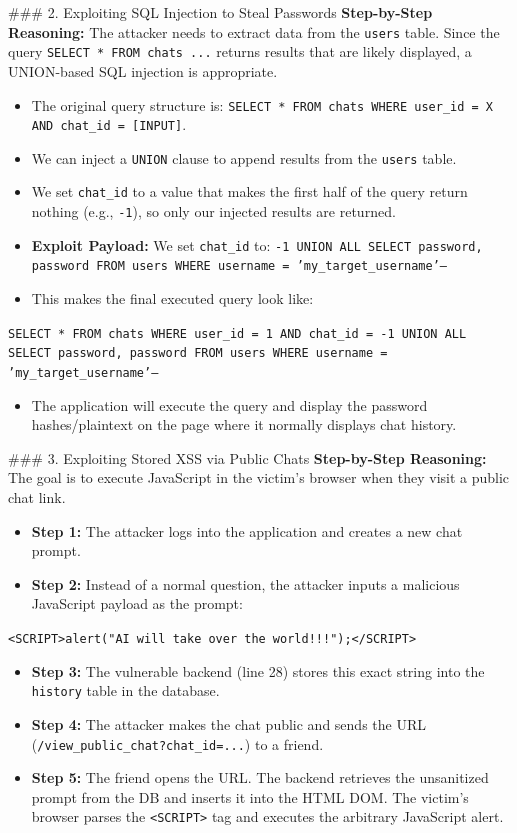 \documentclass{article}
\begin{document}
\#\#\# 2. Exploiting SQL Injection to Steal Passwords
\textbf{Step-by-Step Reasoning:}
The attacker needs to extract data from the \texttt{users} table. Since the query \texttt{SELECT * FROM chats ...} returns results that are likely displayed, a UNION-based SQL injection is appropriate.
\begin{itemize}
    \item The original query structure is: \texttt{SELECT * FROM chats WHERE user\_id = X AND chat\_id = [INPUT]}.
    \item We can inject a \texttt{UNION} clause to append results from the \texttt{users} table.
    \item We set \texttt{chat\_id} to a value that makes the first half of the query return nothing (e.g., \texttt{-1}), so only our injected results are returned.
    \item \textbf{Exploit Payload:} We set \texttt{chat\_id} to: \texttt{-1 UNION ALL SELECT password, password FROM users WHERE username = 'my\_target\_username'--}
    \item This makes the final executed query look like:
\end{itemize}
\texttt{SELECT * FROM chats WHERE user\_id = 1 AND chat\_id = -1 UNION ALL SELECT password, password FROM users WHERE username = 'my\_target\_username'--}
\begin{itemize}
    \item The application will execute the query and display the password hashes/plaintext on the page where it normally displays chat history.

\end{itemize}
\#\#\# 3. Exploiting Stored XSS via Public Chats
\textbf{Step-by-Step Reasoning:}
The goal is to execute JavaScript in the victim's browser when they visit a public chat link.
\begin{itemize}
    \item \textbf{Step 1:} The attacker logs into the application and creates a new chat prompt.
    \item \textbf{Step 2:} Instead of a normal question, the attacker inputs a malicious JavaScript payload as the prompt:
\end{itemize}
\texttt{<SCRIPT>alert("AI will take over the world!!!");</SCRIPT>}
\begin{itemize}
    \item \textbf{Step 3:} The vulnerable backend (line 28) stores this exact string into the \texttt{history} table in the database.
    \item \textbf{Step 4:} The attacker makes the chat public and sends the URL (\texttt{/view\_public\_chat?chat\_id=...}) to a friend.
    \item \textbf{Step 5:} The friend opens the URL. The backend retrieves the unsanitized prompt from the DB and inserts it into the HTML DOM. The victim's browser parses the \texttt{<SCRIPT>} tag and executes the arbitrary JavaScript alert.
\end{itemize}
\end{document}
